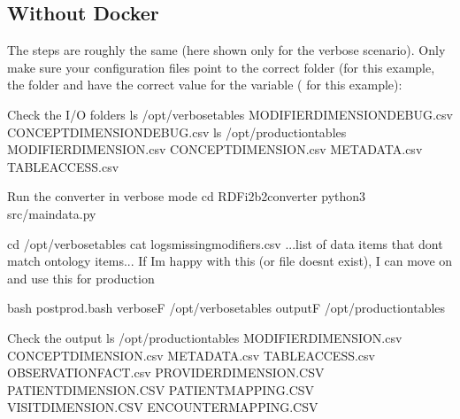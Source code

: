 \documentclass[letterpaper,10pt,english]{sphinxmanual}
\begin{document}
\subsection{Without Docker}
\label{\detokenize{run_data:without-docker}}
The steps are roughly the same (here shown only for the verbose scenario). Only make sure your configuration files point to the correct folder (for this example, the  folder and have the correct value for the  variable ( for this example):
\def\sphinxLiteralBlockLabel{\label{\detokenize{run_data:id3}}}
%
\begin{sphinxVerbatim}[commandchars=\\\{\}]
\PYGZsh{} Check the I/O folders
\PYGZdl{} ls /opt/verbose\PYGZus{}tables
        MODIFIER\PYGZus{}DIMENSION\PYGZus{}DEBUG.csv CONCEPT\PYGZus{}DIMENSION\PYGZus{}DEBUG.csv
\PYGZdl{} ls /opt/production\PYGZus{}tables
        MODIFIER\PYGZus{}DIMENSION.csv CONCEPT\PYGZus{}DIMENSION.csv
        METADATA.csv TABLE\PYGZus{}ACCESS.csv

\PYGZsh{} Run the converter in verbose mode
\PYGZdl{} cd RDF\PYGZhy{}i2b2\PYGZhy{}converter
\PYGZdl{} python3 src/main\PYGZus{}data.py

\PYGZdl{} cd /opt/verbose\PYGZus{}tables
\PYGZdl{} cat logs\PYGZus{}missing\PYGZus{}modifiers.csv
        ...\PYGZlt{}list of data items that don\PYGZsq{}t match ontology items\PYGZgt{}...
\PYGZsh{} If I\PYGZsq{}m happy with this (or file doesn\PYGZsq{}t exist),
\PYGZsh{} I can move on and use this for production

\PYGZdl{} bash postprod.bash \PYGZhy{}verboseF /opt/verbose\PYGZus{}tables \PYGZhy{}outputF /opt/production\PYGZus{}tables

\PYGZsh{} Check the output
\PYGZdl{} ls /opt/production\PYGZus{}tables
        MODIFIER\PYGZus{}DIMENSION.csv CONCEPT\PYGZus{}DIMENSION.csv
        METADATA.csv TABLE\PYGZus{}ACCESS.csv
        OBSERVATION\PYGZus{}FACT.csv PROVIDER\PYGZus{}DIMENSION.CSV
        PATIENT\PYGZus{}DIMENSION.CSV PATIENT\PYGZus{}MAPPING.CSV
        VISIT\PYGZus{}DIMENSION.CSV ENCOUNTER\PYGZus{}MAPPING.CSV
\end{sphinxVerbatim}
\sphinxresetverbatimhllines
\end{document}
